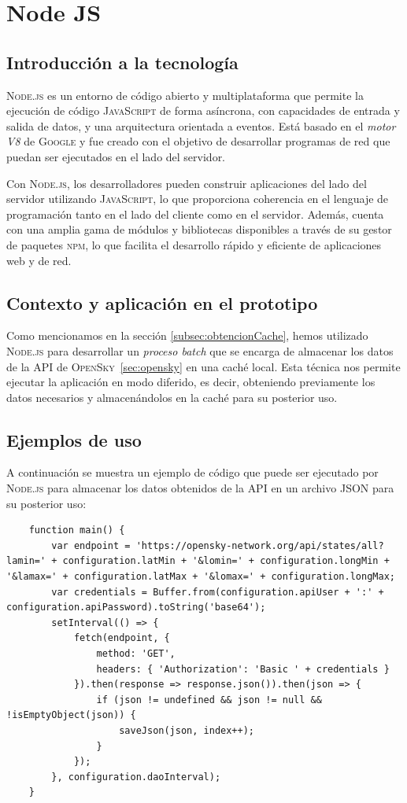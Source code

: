 \documentclass[a4paper, 11pt]{book}
\begin{document}
\section{Node JS}
\subsection{Introducción a la tecnología}
\textsc{Node.js} es un entorno de código abierto y multiplataforma que permite la ejecución de código \textsc{JavaScript} de forma asíncrona, con capacidades de entrada y salida de datos, y una arquitectura orientada a eventos. Está basado en el \emph{motor V8} de \textsc{Google} y fue creado con el objetivo de desarrollar programas de red que puedan ser ejecutados en el lado del servidor.

Con \textsc{Node.js}, los desarrolladores pueden construir aplicaciones del lado del servidor utilizando \textsc{JavaScript}, lo que proporciona coherencia en el lenguaje de programación tanto en el lado del cliente como en el servidor. Además, cuenta con una amplia gama de módulos y bibliotecas disponibles a través de su gestor de paquetes \textsc{\gls{npm}}, lo que facilita el desarrollo rápido y eficiente de aplicaciones web y de red.
\subsection{Contexto y aplicación en el prototipo}
Como mencionamos en la sección \ref{subsec:obtencionCache}, hemos utilizado \textsc{Node.js} para desarrollar un \emph{proceso batch} que se encarga de almacenar los datos de la \textsc{API} de \textsc{OpenSky}~\ref{sec:opensky} en una caché local. Esta técnica nos permite ejecutar la aplicación en modo diferido, es decir, obteniendo previamente los datos necesarios y almacenándolos en la caché para su posterior uso.
\subsection{Ejemplos de uso}
A continuación se muestra un ejemplo de código que puede ser ejecutado por \textsc{Node.js} para almacenar los datos obtenidos de la \textsc{API} en un archivo \textsc{\gls{JSON}} para su posterior uso:
\begin{verbatim}
	function main() {
		var endpoint = 'https://opensky-network.org/api/states/all?lamin=' + configuration.latMin + '&lomin=' + configuration.longMin + '&lamax=' + configuration.latMax + '&lomax=' + configuration.longMax;
		var credentials = Buffer.from(configuration.apiUser + ':' + configuration.apiPassword).toString('base64');
		setInterval(() => {
			fetch(endpoint, {
				method: 'GET',
				headers: { 'Authorization': 'Basic ' + credentials }
			}).then(response => response.json()).then(json => {
				if (json != undefined && json != null && !isEmptyObject(json)) {
					saveJson(json, index++);
				}
			});
		}, configuration.daoInterval);
	}
\end{verbatim}
\label{sec:nodejs}
\end{document}
